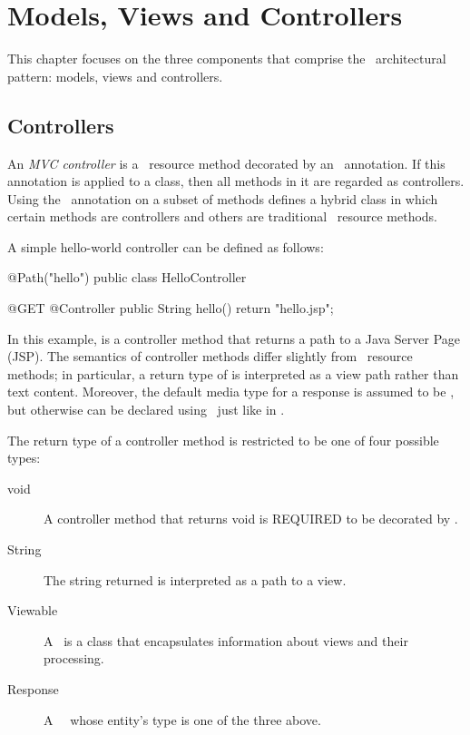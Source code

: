 \chapter{Models, Views and Controllers}
\label{mvc}

This chapter focuses on the three components that comprise the \mvc\ architectural pattern: models, views
and controllers. 

\section{Controllers}
\label{controllers}

An {\em MVC controller} is a \jaxrs\ resource method decorated by an \Controller\ annotation. If 
this annotation is applied to a class, then all methods in it are regarded as controllers. 
Using the \Controller\ annotation on a subset of methods defines a hybrid class in which 
certain methods are controllers and others are traditional \jaxrs\ resource methods.

A simple hello-world controller can be defined as follows:

\begin{listing}{1}
@Path("hello")
public class HelloController {

    @GET
    @Controller
    public String hello() {
        return "hello.jsp";
    }
}
\end{listing}

In this example,  is a controller method that returns a path to a Java Server Page (JSP).
The semantics of controller methods differ slightly from \jaxrs\ resource methods; in particular, a
return type of  is interpreted as a view path rather than text content. Moreover,
the default media type for a response is assumed to be , but otherwise can
be declared using \Produces\ just like in \jaxrs.

The return type of a controller method is restricted to be one of four possible types:
\begin{description}
\item[void] A controller method that returns void is REQUIRED to be decorated by \View. 
\item[String] The string returned is interpreted as a path to a view. 
\item[Viewable] A \Viewable\ is a class that encapsulates information about views and their processing.
\item[Response] A \jaxrs\ \Response\ whose entity's type is one of the three above.
\end{description}

